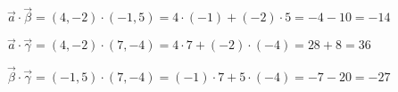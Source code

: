 \begin{alist}
\item $ \vec{a}\cdot\vec{\beta}=(4,-2)\cdot(-1,5)=4\cdot(-1)+(-2)\cdot 5=-4-10=-14 $
\item $ \vec{a}\cdot\vec{\gamma}=(4,-2)\cdot(7,-4)=4\cdot 7+(-2)\cdot(-4)=28+8=36 $
\item $ \vec{\beta}\cdot\vec{\gamma}=(-1,5)\cdot(7,-4)=(-1)\cdot 7+5\cdot(-4)=-7-20=-27 $
\end{alist}
